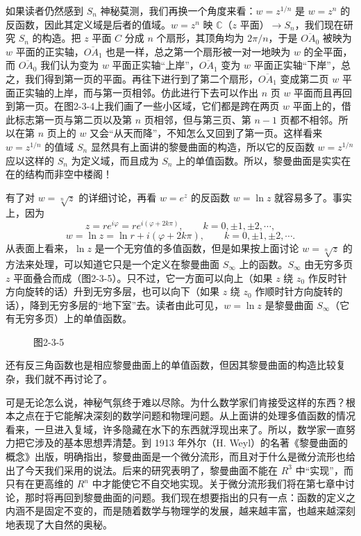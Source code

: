 如果读者仍然感到 $S_n$ 神秘莫测，我们再换一个角度来看：$w=z^{1/n}$ 是 $w=z^n$ 的反函数，因此其定义域是后者的值域。$w=z^n$ 映 $\mathbb C$（$z$ 平面）$\to S_n$，我们现在研究 $S_n$ 的构造。把 $z$ 平面 $C$ 分成 $n$ 个扇形，其顶角均为 $2\pi/n$，于是 $\overline{OA_0}$ 被映为 $w$ 平面的正实轴，$\overline{OA_1}$ 也是一样，总之第一个扇形被一对一地映为 $w$ 的全平面，而 $\overline{OA_0}$ 我们认为变为 $w$ 平面正实轴“上岸”，$\overline{OA_1}$ 变为 $w$ 平面正实轴“下岸”，总之，我们得到第一页的平面。再往下进行到了第二个扇形，$\overline{OA_1}$ 变成第二页 $w$ 平面正实轴的上岸，而与第一页相邻。仿此进行下去可以作出 $n$ 页 $w$ 平面而且再回到第一页。在图2-3-4上我们画了一些小区域，它们都是跨在两页 $w$ 平面上的，借此标志第一页与第二页以及第 $n$ 页相邻，但与第三页、第 $n-1$ 页都不相邻。所以在第 $n$ 页上的 $w$ 又会“从天而降”，不知怎么又回到了第一页。这样看来 $w=z^{1/n}$ 的值域 $S_n$ 显然具有上面讲的黎曼曲面的构造，所以它的反函数 $w=z^{1/n}$ 应以这样的 $S_n$ 为定义域，而且成为 $S_n$ 上的单值函数。所以，黎曼曲面是实实在在的结构而非空中楼阁！

有了对 $w=\sqrt[n]{z}$ 的详细讨论，再看 $w=e^z$ 的反函数 $w=\ln z$ 就容易多了。事实上，因为
\[
z=re^{i\varphi}=re^{i(\varphi+2k\pi)},\qquad k=0,\pm1,\pm2,\cdots,
\]
\begin{equation}
 w=\ln z=\ln r+i(\varphi+2k\pi),\qquad k=0,\pm1,\pm2,\cdots.
 \tag{6}
\end{equation}
从表面上看来，$\ln z$ 是一个无穷值的多值函数，但是如果按上面讨论 $w=\sqrt[n]{z}$ 的方法来处理，可以知道它只是一个定义在黎曼曲面 $S_\infty$ 上的函数。$S_\infty$ 由无穷多页 $z$ 平面叠合而成（图2-3-5）。只不过，它一方面可以向上（如果 $z$ 绕 $z_0$ 作反时针方向旋转的话）升到无穷多层，也可以向下（如果 $z$ 绕 $z_0$ 作顺时针方向旋转的话），降到无穷多层的“地下室”去。读者由此可见，$w=\ln z$ 是黎曼曲面 $S_\infty$（它有无穷多页）上的单值函数。

\begin{figure}[htbp]
\centering
{}
\caption*{图2-3-5}
\end{figure}

还有反三角函数也是相应黎曼曲面上的单值函数，但因其黎曼曲面的构造比较复杂，我们就不再讨论了。

可是无论怎么说，神秘气氛终于难以尽除。为什么数学家们肯接受这样的东西？根本之点在于它能解决深刻的数学问题和物理问题。从上面讲的处理多值函数的情况看来，一旦进入复域，许多隐藏在水下的东西就浮现出来了。所以，数学家一直努力把它涉及的基本思想弄清楚。到 1913 年外尔（H. Weyl）的名著《黎曼曲面的概念》出版，明确指出，黎曼曲面是一个微分流形，而且对于什么是微分流形也给出了今天我们采用的说法。后来的研究表明了，黎曼曲面不能在 $R^3$ 中“实现”，而只有在更高维的 $R^n$ 中才能使它不自交地实现。关于微分流形我们将在第七章中讨论，那时将再回到黎曼曲面的问题。我们现在想要指出的只有一点：函数的定义之内涵不是固定不变的，而是随着数学与物理学的发展，越来越丰富，也越来越深刻地表现了大自然的奥秘。

